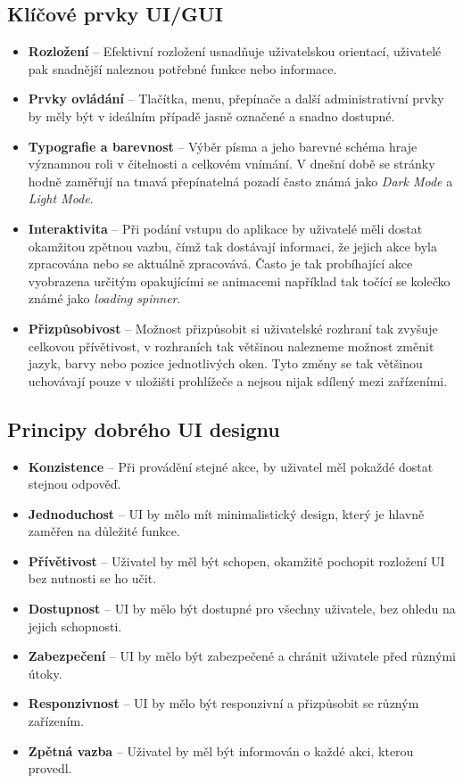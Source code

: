 \subsection*{Klíčové prvky UI/GUI}
\label{subsec:ui-gui-theory-key-elements}
\begin{itemize}
    \item \textbf{Rozložení} -- Efektivní rozložení usnadňuje uživatelskou orientací, uživatelé pak snadnější naleznou potřebné funkce nebo informace.
    \item \textbf{Prvky ovládání} -- Tlačítka, menu, přepínače a další administrativní prvky by měly být v ideálním případě jasně označené a snadno dostupné.
    \item \textbf{Typografie a barevnost} -- Výběr písma a jeho barevné schéma hraje významnou roli v čitelnosti a celkovém vnímání. V dnešní době se stránky hodně zaměřují na tmavá přepínatelná pozadí často známá jako \textit{Dark Mode} a \textit{Light Mode}.
    \item \textbf{Interaktivita} -- Při podání vstupu do aplikace by uživatelé měli dostat okamžitou zpětnou vazbu, čímž tak dostávají informaci, že jejich akce byla zpracována nebo se aktuálně zpracovává. Často je tak probíhající akce vyobrazena určitým opakujícími se animacemi například tak točící se kolečko známé jako \textit{loading spinner}.
    \item \textbf{Přizpůsobivost} -- Možnost přizpůsobit si uživatelské rozhraní tak zvyšuje celkovou přívětivost, v rozhraních tak většinou nalezneme možnost změnit jazyk, barvy nebo pozice jednotlivých oken. Tyto změny se tak většinou uchovávají pouze v uložišti prohlížeče a nejsou nijak sdílený mezi zařízeními.
\end{itemize}

\subsection*{Principy dobrého UI designu}
\label{subsec:ui-gui-theore-basic-use-case}
\begin{itemize}
    \item \textbf{Konzistence} -- Při provádění stejné akce, by uživatel měl pokaždé dostat stejnou odpověď.
    \item \textbf{Jednoduchost} -- UI by mělo mít minimalistický design, který je hlavně zaměřen na důležité funkce.
    \item \textbf{Přívětivost} -- Uživatel by měl být schopen, okamžitě pochopit rozložení UI bez nutnosti se ho učit.
    \item \textbf{Dostupnost} -- UI by mělo být dostupné pro všechny uživatele, bez ohledu na jejich schopnosti.
    \item \textbf{Zabezpečení} -- UI by mělo být zabezpečené a chránit uživatele před různými útoky.
    \item \textbf{Responzivnost} -- UI by mělo být responzivní a přizpůsobit se různým zařízením.
    \item \textbf{Zpětná vazba} -- Uživatel by měl být informován o každé akci, kterou provedl.
\end{itemize}

